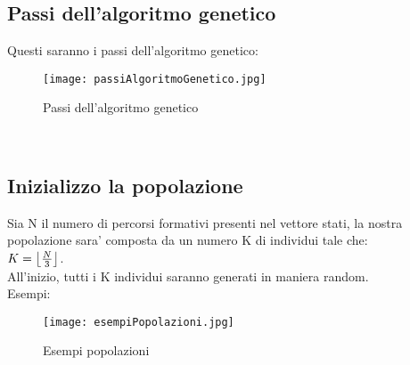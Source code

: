 \documentclass[10pt,a4paper]{article}
\begin{document}
    \subsection{Passi dell'algoritmo genetico}
      \label{passiDellAlgoritmoGeneticoSubsection}
      Questi saranno i passi dell'algoritmo genetico:\\
      \begin{figure}[h!]
        \centering
        \caption{Passi dell'algoritmo genetico}
        \texttt{[image: passiAlgoritmoGenetico.jpg]}
        \label{passiAlgoritmoGenetico}
      \end{figure}\\
      
    \subsection{Inizializzo la popolazione}
      \label{inizializzoLaPopolazioneSubsection}
      Sia N il numero di percorsi formativi presenti nel vettore stati, la nostra\\
      popolazione sara' composta da un numero K di individui tale che:\\ 
      $ K = \bigl\lfloor {N \over 3} \bigl\rfloor $.\\
      All'inizio, tutti i K individui saranno generati in maniera random.\\
      Esempi:
      \begin{figure}
        \centering
        \caption{Esempi popolazioni}
        \texttt{[image: esempiPopolazioni.jpg]}
        \label{esempiPopolazioni}
      \end{figure}
      \\\\\\\\\\\\\\\\\\\\\\\\\\\\\\\\\\\\\\\\
\end{document}
